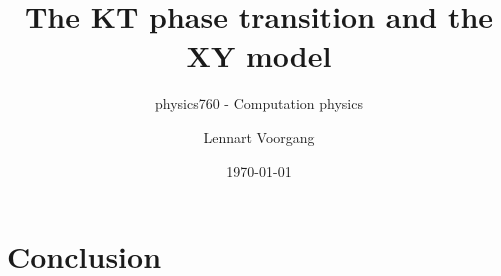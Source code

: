 \documentclass[a4paper,11pt,german,titlepage,listof=totoc,bibliography=totoc,parskip=half]{scrarticle}
\title{The KT phase transition and the XY model}
\subtitle{physics760 - Computation physics}
\author{Lennart Voorgang}
\date{\today}
\begin{document}
	\maketitle
	
	\tableofcontents
    \clearpage
 
	
	
	
	
	\section{Conclusion}
	
\end{document}
